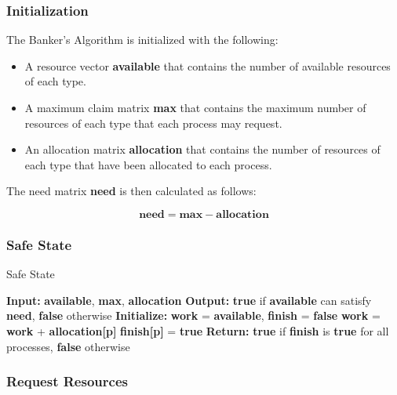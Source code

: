 \subsubsection{Initialization}

The Banker's Algorithm is initialized with the following:

\begin{itemize}
	\item A resource vector \textbf{available} that contains the number of available resources of each type.
	\item A maximum claim matrix \textbf{max} that contains the maximum number of resources of each type that each process may request.
	\item An allocation matrix \textbf{allocation} that contains the number of resources of each type that have been allocated to each process.
\end{itemize}

The need matrix \textbf{need} is then calculated as follows:

\begin{equation}
	\textbf{need} = \textbf{max} - \textbf{allocation}
\end{equation}

\pagebreak

\subsubsection{Safe State}

\begin{algorithm}
	\caption{Safe State}
	\label{alg:safe_state}
	\begin{algorithmic}
		\State \textbf{Input:} \textbf{available}, \textbf{max}, \textbf{allocation}
		\State \textbf{Output:} \textbf{true} if \textbf{available} can satisfy \textbf{need}, \textbf{false} otherwise
		\State \textbf{Initialize:} \textbf{work} = \textbf{available}, \textbf{finish} = \textbf{false}
		\State \textbf{work} = \textbf{work} + \textbf{allocation[p]}
		\State \textbf{finish[p]} = \textbf{true}
		\EndIf
		\EndWhile
		\State \textbf{Return:} \textbf{true} if \textbf{finish} is \textbf{true} for all processes, \textbf{false} otherwise
	\end{algorithmic}
\end{algorithm}

\subsubsection{Request Resources}

